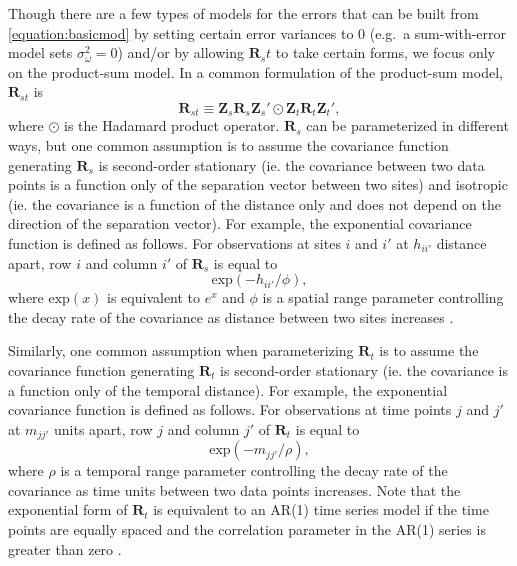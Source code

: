 \documentclass[]{interact}
\theoremstyle{plain}%
\theoremstyle{definition}
\theoremstyle{remark}
\begin{document}
Though there are a few types of models for the errors that can be built
from \ref{equation:basicmod} by setting certain error variances to 0
(e.g.~a sum-with-error model sets \(\sigma^2_{\omega} = 0\)) and/or by
allowing \(\mathbf{R}_st\) to take certain forms, we focus only on the
product-sum model. In a common formulation of the product-sum model,
\(\mathbf{R}_{st}\) is \mbox{} \begin{equation*}
\mathbf{R}_{st} \equiv \mathbf{Z}_{s} \mathbf{R}_{s} \mathbf{Z}_{s}' \odot \mathbf{Z}_t \mathbf{R}_t \mathbf{Z}_t',
\end{equation*} \noindent where \(\odot\) is the Hadamard product
operator. \(\mathbf{R}_s\) can be parameterized in different ways, but
one common assumption is to assume the covariance function generating
\(\mathbf{R}_s\) is second-order stationary (ie. the covariance between
two data points is a function only of the separation vector between two
sites) and isotropic (ie. the covariance is a function of the distance
only and does not depend on the direction of the separation vector). For
example, the exponential covariance function is defined as follows. For
observations at sites \(i\) and \(i'\) at \(h_{ii'}\) distance apart,
row \(i\) and column \(i'\) of \(\mathbf{R}_{s}\) is equal to \mbox{}
\begin{equation}
\label{equation:spatcov}
\text{exp}(-h_{ii'} / \phi),
\end{equation} \noindent where \(\text{exp}(x)\) is equivalent to
\(e^x\) and \(\phi\) is a spatial range parameter controlling the decay
rate of the covariance as distance between two sites increases
\citep{cressie2015statistics}.

Similarly, one common assumption when parameterizing \(\mathbf{R}_t\) is
to assume the covariance function generating \(\mathbf{R}_t\) is
second-order stationary (ie. the covariance is a function only of the
temporal distance). For example, the exponential covariance function is
defined as follows. For observations at time points \(j\) and \(j'\) at
\(m_{jj'}\) units apart, row \(j\) and column \(j'\) of
\(\mathbf{R}_{t}\) is equal to \mbox{} \begin{equation}
\label{equation:tempcov}
\text{exp}(-m_{jj'} / \rho),
\end{equation} \noindent where \(\rho\) is a temporal range parameter
controlling the decay rate of the covariance as time units between two
data points increases. Note that the exponential form of
\(\mathbf{R}_t\) is equivalent to an AR(1) time series model if the time
points are equally spaced and the correlation parameter in the AR(1)
series is greater than zero \citep{schabenberger2017statistical}.
\end{document}
